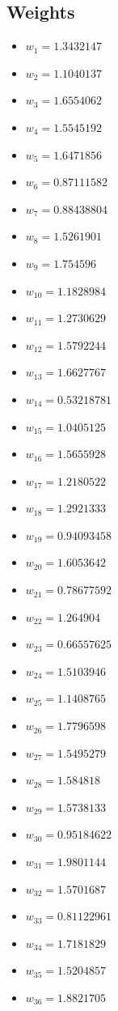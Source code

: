 \documentclass[11pt]{article}
\begin{document}
\subsection*{Weights}
\begin{itemize}
\item $w_{1} = 1.3432147$
\item $w_{2} = 1.1040137$
\item $w_{3} = 1.6554062$
\item $w_{4} = 1.5545192$
\item $w_{5} = 1.6471856$
\item $w_{6} = 0.87111582$
\item $w_{7} = 0.88438804$
\item $w_{8} = 1.5261901$
\item $w_{9} = 1.754596$
\item $w_{10} = 1.1828984$
\item $w_{11} = 1.2730629$
\item $w_{12} = 1.5792244$
\item $w_{13} = 1.6627767$
\item $w_{14} = 0.53218781$
\item $w_{15} = 1.0405125$
\item $w_{16} = 1.5655928$
\item $w_{17} = 1.2180522$
\item $w_{18} = 1.2921333$
\item $w_{19} = 0.94093458$
\item $w_{20} = 1.6053642$
\item $w_{21} = 0.78677592$
\item $w_{22} = 1.264904$
\item $w_{23} = 0.66557625$
\item $w_{24} = 1.5103946$
\item $w_{25} = 1.1408765$
\item $w_{26} = 1.7796598$
\item $w_{27} = 1.5495279$
\item $w_{28} = 1.584818$
\item $w_{29} = 1.5738133$
\item $w_{30} = 0.95184622$
\item $w_{31} = 1.9801144$
\item $w_{32} = 1.5701687$
\item $w_{33} = 0.81122961$
\item $w_{34} = 1.7181829$
\item $w_{35} = 1.5204857$
\item $w_{36} = 1.8821705$

\end{itemize}
\end{document}
